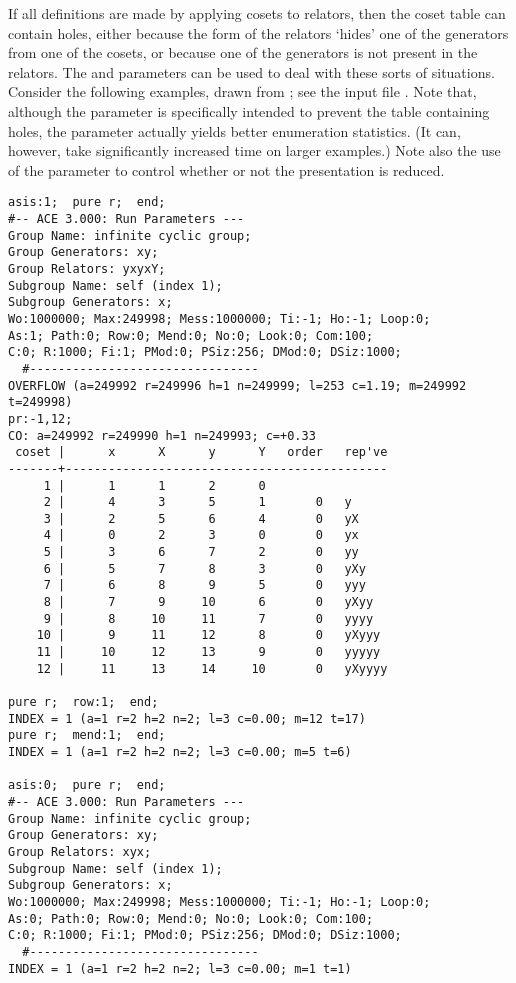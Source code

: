 
If all definitions are made by applying cosets to relators, then the coset
  table can contain holes, either because the form of the relators `hides'
  one of the generators from one of the cosets, or because one of the
  generators is not present in the relators.
The  and  parameters can be used to deal with these
  sorts of situations.
Consider the following examples, drawn from \cite{War}; see the input file
  .
Note that, although the  parameter is specifically intended to
  prevent the table containing holes, the  parameter actually
  yields better enumeration statistics.
(It can, however, take significantly increased time on larger examples.)
Note also the use of the  parameter to control whether or not
  the presentation is reduced.

\bv\begin{verbatim}
asis:1;  pure r;  end;  
#-- ACE 3.000: Run Parameters ---
Group Name: infinite cyclic group;
Group Generators: xy;
Group Relators: yxyxY;
Subgroup Name: self (index 1);
Subgroup Generators: x;
Wo:1000000; Max:249998; Mess:1000000; Ti:-1; Ho:-1; Loop:0;
As:1; Path:0; Row:0; Mend:0; No:0; Look:0; Com:100;
C:0; R:1000; Fi:1; PMod:0; PSiz:256; DMod:0; DSiz:1000;
  #--------------------------------
OVERFLOW (a=249992 r=249996 h=1 n=249999; l=253 c=1.19; m=249992 t=249998)
pr:-1,12;
CO: a=249992 r=249990 h=1 n=249993; c=+0.33
 coset |      x      X      y      Y   order   rep've
-------+---------------------------------------------
     1 |      1      1      2      0
     2 |      4      3      5      1       0   y
     3 |      2      5      6      4       0   yX
     4 |      0      2      3      0       0   yx
     5 |      3      6      7      2       0   yy
     6 |      5      7      8      3       0   yXy
     7 |      6      8      9      5       0   yyy
     8 |      7      9     10      6       0   yXyy
     9 |      8     10     11      7       0   yyyy
    10 |      9     11     12      8       0   yXyyy
    11 |     10     12     13      9       0   yyyyy
    12 |     11     13     14     10       0   yXyyyy

pure r;  row:1;  end;
INDEX = 1 (a=1 r=2 h=2 n=2; l=3 c=0.00; m=12 t=17)
pure r;  mend:1;  end;
INDEX = 1 (a=1 r=2 h=2 n=2; l=3 c=0.00; m=5 t=6)

asis:0;  pure r;  end;  
#-- ACE 3.000: Run Parameters ---
Group Name: infinite cyclic group;
Group Generators: xy;
Group Relators: xyx;
Subgroup Name: self (index 1);
Subgroup Generators: x;
Wo:1000000; Max:249998; Mess:1000000; Ti:-1; Ho:-1; Loop:0;
As:0; Path:0; Row:0; Mend:0; No:0; Look:0; Com:100;
C:0; R:1000; Fi:1; PMod:0; PSiz:256; DMod:0; DSiz:1000;
  #--------------------------------
INDEX = 1 (a=1 r=2 h=2 n=2; l=3 c=0.00; m=1 t=1)


\end{verbatim}
